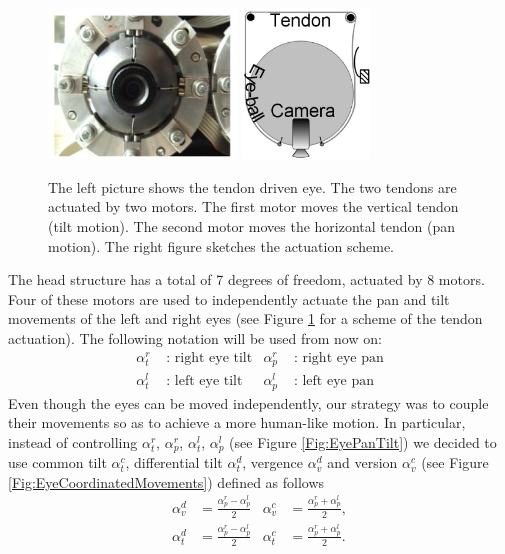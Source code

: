 \begin{figure}
  \centering
  \includegraphics[height=40mm]{Figure/EyePhoto.eps} \hspace{1cm}
  \includegraphics[height=40mm]{Figure/EyeSection.eps}\\
  \caption{The left picture shows the tendon driven eye. The
 two tendons are actuated by two motors. The first motor moves the vertical
  tendon (tilt motion). The second motor moves the horizontal tendon (pan motion). The
  right figure sketches the actuation scheme.}\label{Fig:EyeSection}
\end{figure}


The head structure has a total of 7 degrees of freedom, actuated by 8 motors. Four of these motors are used to independently actuate the pan and tilt movements of the left and right eyes (see Figure \ref{Fig:EyeSection} for a scheme of the tendon actuation). The following notation will be used from now on:
\begin{align*}
\alpha_t^r & \mbox{ : } \mbox{right eye tilt} & \alpha_p^r & \mbox{ : } \mbox{right eye pan}\\
\alpha_t^l & \mbox{ : } \mbox{left eye tilt} & \alpha_p^l & \mbox{ : } \mbox{left eye pan}
\end{align*}
Even though the eyes can be moved independently, our strategy was to couple their movements so as to achieve a more human-like motion. In particular, instead of controlling $\alpha_t^r$, $\alpha_p^r$, $\alpha_t^l$, $\alpha_p^l$ (see Figure \ref{Fig:EyePanTilt}) we decided to use common tilt $\alpha_t^c$, differential tilt $\alpha_t^d$, vergence $\alpha_v^d$ and version $\alpha_v^c$ (see Figure \ref{Fig:EyeCoordinatedMovements}) defined as follows %
\begin{align*}
\alpha_v^d & = \frac{\alpha_p^r - \alpha_p^l}{2} & \alpha_v^c & = \frac{\alpha_p^r + \alpha_p^l}{2},\\
\alpha_t^d & = \frac{\alpha_p^r - \alpha_p^l}{2} & \alpha_t^c & = \frac{\alpha_p^r + \alpha_p^l}{2}.
\end{align*}


